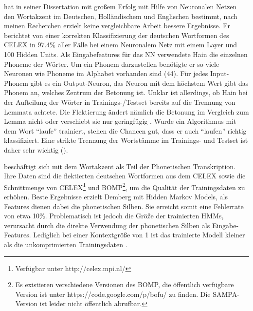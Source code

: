 

\cite{Hain2004} hat in seiner Dissertation mit großem Erfolg mit Hilfe von Neuronalen Netzen den Wortakzent im Deutschen, Holländischem und Englischen bestimmt, nach meinen Recherchen erzielt keine vergleichbare Arbeit bessere Ergebnisse. Er berichtet von einer korrekten Klassifizierung der deutschen Wortformen des CELEX in 97.4\% aller Fälle bei einem Neuronalem Netz mit einem Layer und 100 Hidden Units. Als Eingabefeatures für das NN verwendete Hain die einzelnen Phoneme der Wörter. Um ein Phonem darzustellen benötigte er so viele Neuronen wie Phoneme im Alphabet vorhanden sind (44). Für jedes Input-Phonem gibt es ein Output-Neuron, das Neuron mit dem höchstem Wert gibt das Phonem an, welches Zentrum der Betonung ist. Unklar ist allerdings, ob Hain bei der Aufteilung der Wörter in Trainings-/Testset bereits auf die Trennung von Lemmata achtete. Die Flektierung ändert nämlich die Betonung im Vergleich zum Lemma nicht oder verschiebt sie nur geringfügig \cite{}. Wurde ein Algorithmus mit dem Wort \enquote{laufe} trainiert, stehen die Chancen gut, dass er auch \enquote{laufen} richtig klassifiziert. Eine strikte Trennung der Wortstämme im Trainings- und Testset ist daher sehr wichtig (\cite[S.~22]{Demberg2006}).


\cite{Demberg2006} beschäftigt sich mit dem Wortakzent als Teil der Phonetischen Transkription. Ihre Daten sind die flektierten deutschen Wortformen aus dem CELEX sowie die Schnittmenge von CELEX\footnote{Verfügbar unter http://celex.mpi.nl/} und BOMP\footnote{Es existieren verschiedene Versionen des BOMP, die öffentlich verfügbare Version ist unter https://code.google.com/p/bofu/ zu finden. Die SAMPA-Version ist leider nicht öffentlich abrufbar.}, um die Qualität der Trainingsdaten zu erhöhen.
Beste Ergebnisse erzielt Demberg mit Hidden Markov Models, als Features dienen dabei die phonetischen Silben. Sie erreicht somit eine Fehlerrate von etwa 10\%.
Problematisch ist jedoch die Größe der trainierten HMMs, verursacht durch die direkte Verwendung der phonetischen Silben als Eingabe-Features. Lediglich bei einer Kontextgröße von 1 ist das trainierte Modell kleiner als die unkomprimierten Trainingsdaten \cite[S.~71]{Demberg2006}.

